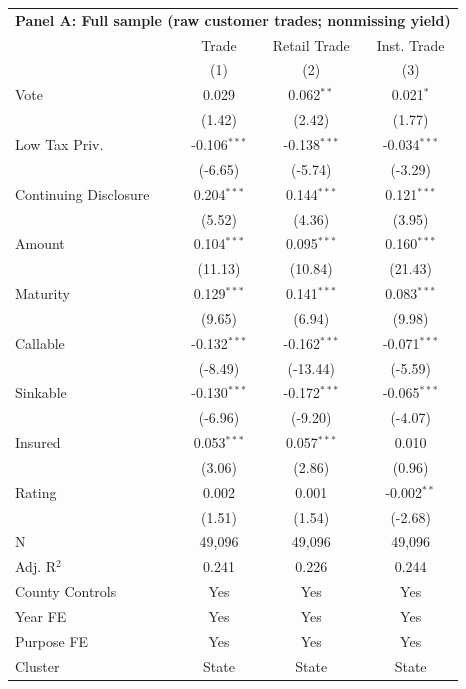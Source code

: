 \begingroup
\centering
\begin{tabular*}{\textwidth}{@{\extracolsep{\fill}}lccc}
\multicolumn{5}{l}{\textbf{Panel A: Full sample (raw customer trades; nonmissing yield)}}\\

\addlinespace
   \toprule
                         & Trade          & Retail Trade   & Inst. Trade\\  
                         & (1)            & (2)            & (3)\\  
   \midrule 
   Vote                  & 0.029          & 0.062$^{**}$   & 0.021$^{*}$\\   
                         & (1.42)        & (2.42)        & (1.77)\\   
   Low Tax Priv.         & -0.106$^{***}$ & -0.138$^{***}$ & -0.034$^{***}$\\   
                         & (-6.65)       & (-5.74)       & (-3.29)\\   
   Continuing Disclosure & 0.204$^{***}$  & 0.144$^{***}$  & 0.121$^{***}$\\   
                         & (5.52)        & (4.36)        & (3.95)\\   
   Amount                & 0.104$^{***}$  & 0.095$^{***}$  & 0.160$^{***}$\\   
                         & (11.13)       & (10.84)       & (21.43)\\   
   Maturity              & 0.129$^{***}$  & 0.141$^{***}$  & 0.083$^{***}$\\   
                         & (9.65)        & (6.94)        & (9.98)\\   
   Callable              & -0.132$^{***}$ & -0.162$^{***}$ & -0.071$^{***}$\\   
                         & (-8.49)       & (-13.44)      & (-5.59)\\   
   Sinkable              & -0.130$^{***}$ & -0.172$^{***}$ & -0.065$^{***}$\\   
                         & (-6.96)       & (-9.20)       & (-4.07)\\   
   Insured               & 0.053$^{***}$  & 0.057$^{***}$  & 0.010\\   
                         & (3.06)        & (2.86)        & (0.96)\\   
   Rating                & 0.002          & 0.001          & -0.002$^{**}$\\   
                         & (1.51)        & (1.54)        & (-2.68)\\   
   \hline
   N          & 49,096         & 49,096         & 49,096\\  
   Adj. R$^2$        & 0.241          & 0.226          & 0.244\\  
   County Controls       & Yes            & Yes            & Yes\\  
   Year FE               & Yes            & Yes            & Yes\\  
   Purpose FE            & Yes            & Yes            & Yes\\  
   Cluster              & State & State & State\\  
   \bottomrule
\end{tabular*}
\par\endgroup
